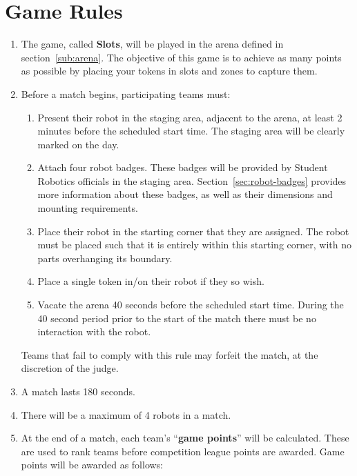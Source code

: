 \section {Game Rules}
\label{game-rules}

\begin{enumerate}
\item The game, called \textbf{Slots}, will be played in the arena defined in section~\ref{sub:arena}.
      The objective of this game is to achieve as many points as possible by placing your tokens in slots and zones to capture them.

\item Before a match begins, participating teams must:
\begin {enumerate}
  \item Present their robot in the staging area, adjacent to the arena, at least 2 minutes before the scheduled start time.
        The staging area will be clearly marked on the day.

  \item Attach four robot badges.
        These badges will be provided by Student Robotics officials in the staging area.
        Section~\ref{sec:robot-badges} provides more information about these badges, as well as their dimensions and mounting requirements.

  \item Place their robot in the starting corner that they are assigned.
        The robot must be placed such that it is entirely within this starting corner, with no parts overhanging its boundary.

  \item Place a single token in/on their robot if they so wish.

  \item Vacate the arena 40 seconds before the scheduled start time.
        During the 40 second period prior to the start of the match there must be no interaction with the robot.
\end{enumerate}
  Teams that fail to comply with this rule may forfeit the match, at the discretion of the judge.

\item A match lasts 180 seconds.

\item There will be a maximum of 4 robots in a match.

\item At the end of a match, each team's ``\textbf{game points}'' will be calculated.
      These are used to rank teams before competition league points are awarded.
      Game points will be awarded as follows:


\end{enumerate}
